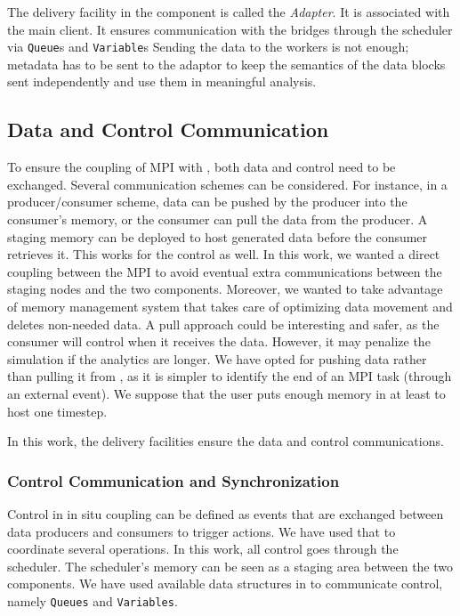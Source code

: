 The delivery facility in the \dask component is called the \textit{Adapter}. It is associated with the main \dask client. It ensures communication with the \deisa bridges through the scheduler via \texttt{Queue}s and \texttt{Variable}s
Sending the data to the workers is not enough; metadata has to be sent to the adaptor to keep the semantics of the data blocks sent independently and use them in meaningful analysis. 


\subsection{Data and Control Communication}\label{sec:DandCcomm}

To ensure the coupling of MPI with \dask, both data and control need to be exchanged. Several communication schemes can be considered. For instance, in a producer/consumer scheme, data can be pushed by the producer into the consumer's memory, or the consumer can pull the data from the producer. A staging memory can be deployed to host generated data before the consumer retrieves it. This works for the control as well. 
In this work, we wanted a direct coupling between the MPI \dask to avoid eventual extra communications between the staging nodes and the two components. Moreover, we wanted to take advantage of \dask memory management system that takes care of optimizing data movement and deletes non-needed data. 
A pull approach could be interesting and safer, as the consumer will control when it receives the data. However, it may penalize the simulation if the analytics are longer.
We have opted for pushing data rather than pulling it from \dask, as it is simpler to identify the end of an MPI task (through an external event). We suppose that the user puts enough memory in \dask at least to host one timestep. 

In this work, the delivery facilities ensure the data and control communications. 

\subsubsection{Control Communication and Synchronization }\label{sec:DandCcomm:control}
Control in in situ coupling can be defined as events that are exchanged between data producers and consumers to trigger actions. We have used that to coordinate several operations. In this work, all control goes through the \dask scheduler. The scheduler's memory can be seen as a staging area between the two components. We have used available data structures in \dask to communicate control, namely \texttt{Queues} and \texttt{Variables}. 


